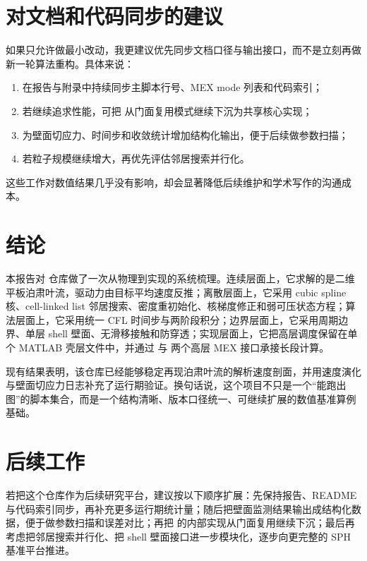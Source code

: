 \section{对文档和代码同步的建议}
如果只允许做最小改动，我更建议优先同步文档口径与输出接口，而不是立刻再做新一轮算法重构。具体来说：
\begin{enumerate}[leftmargin=2.5em]
    \item 在报告与附录中持续同步主脚本行号、MEX mode 列表和代码索引；
    \item 若继续追求性能，可把  从门面复用模式继续下沉为共享核心实现；
    \item 为壁面切应力、时间步和收敛统计增加结构化输出，便于后续做参数扫描；
    \item 若粒子规模继续增大，再优先评估邻居搜索并行化。
\end{enumerate}
这些工作对数值结果几乎没有影响，却会显著降低后续维护和学术写作的沟通成本。

\section{结论}
本报告对  仓库做了一次从物理到实现的系统梳理。连续层面上，它求解的是二维平板泊肃叶流，驱动力由目标平均速度反推；离散层面上，它采用 cubic spline 核、cell-linked list 邻居搜索、密度重初始化、核梯度修正和弱可压状态方程；算法层面上，它采用统一 CFL 时间步与两阶段积分；边界层面上，它采用周期边界、单层 shell 壁面、无滑移接触和防穿透；实现层面上，它把高层调度保留在单个 MATLAB 壳层文件中，并通过  与  两个高层 MEX 接口承接长段计算。

现有结果表明，该仓库已经能够稳定再现泊肃叶流的解析速度剖面，并用速度演化与壁面切应力日志补充了运行期验证。换句话说，这个项目不只是一个“能跑出图”的脚本集合，而是一个结构清晰、版本口径统一、可继续扩展的数值基准算例基础。

\section{后续工作}
若把这个仓库作为后续研究平台，建议按以下顺序扩展：先保持报告、README 与代码索引同步，再补充更多运行期统计量；随后把壁面监测结果输出成结构化数据，便于做参数扫描和误差对比；再把  的内部实现从门面复用继续下沉；最后再考虑把邻居搜索并行化、把 shell 壁面接口进一步模块化，逐步向更完整的 SPH 基准平台推进。
